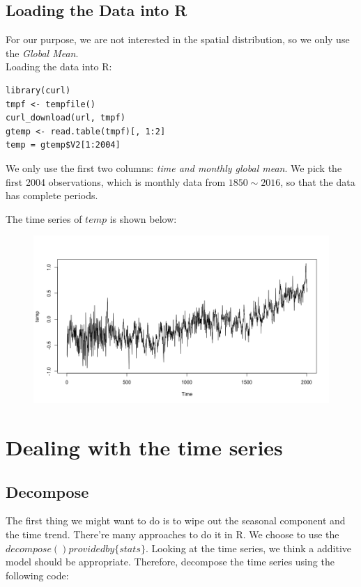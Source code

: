 \documentclass[a4paper, 11pt]{article}
\begin{document}
\subsection{Loading the Data into R}
For our purpose, we are not interested in the spatial distribution, so we only use the \textit{Global Mean}.\\
Loading the data into R:
\begin{verbatim}
library(curl)
tmpf <- tempfile()
curl_download(url, tmpf)
gtemp <- read.table(tmpf)[, 1:2]
temp = gtemp$V2[1:2004]
\end{verbatim}
\indent We only use the first two columns: \textit{time and monthly global mean}. We pick the first 2004 observations, which is monthly data from $1850 \sim 2016$, so that the data has complete periods.\par
The time series of $temp$ is shown below:
\begin{figure}[H]
\centering
\includegraphics[scale=.45]{temp.png}
\end{figure}

\section{Dealing with the time series}

\subsection{Decompose}
The first thing we might want to do is to wipe out the seasonal component and the time trend. There're many approaches to do it in R. We choose to use the $decompose() provided by \{stats\}$. Looking at the time series, we think a additive model should be appropriate. Therefore, decompose the time series using the following code:
\end{document}
